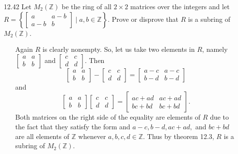 \documentclass[12pt]{article}
\begin{document}
\begin{enumerate}
\item[12.42] Let $M_2(\mathbb{Z})$ be the ring of all $2 \times 2$ matrices over the integers and let \\ 
$R = \left\{ \left[ 
\begin{array}{cc}
a & a - b \\
a - b & b
\end{array} \right] \mid a, b \in \mathbb{Z} \right\}$. Prove or disprove that $R$ is a subring of $M_2(\mathbb{Z})$.
\begin{enumerate}
\item[] Again $R$ is clearly nonempty. So, let us take two elements in $R$, namely 
$\left[ \begin{array}{cc}
a & a \\
b & b
\end{array} \right]$ and $\left[ \begin{array}{cc}
c & c \\
d & d
\end{array} \right]$. Then
\[
\left[ \begin{array}{cc}
a & a \\
b & b
\end{array} \right] - \left[ \begin{array}{cc}
c & c \\
d & d
\end{array} \right] =
\left[ \begin{array}{cc}
a - c & a - c \\
b - d & b - d
\end{array} \right]
\]
and
\[
\left[ \begin{array}{cc}
a & a \\
b & b
\end{array} \right] \left[ \begin{array}{cc}
c & c \\
d & d
\end{array} \right] =
\left[ \begin{array}{cc}
ac + ad & ac + ad \\
bc + bd & bc + bd
\end{array} \right].
\] 
Both matrices on the right side of the equality are elements of $R$ due to the fact that
they satisfy the form and $a - c, b - d, ac + ad,$
and $bc + bd$ are all elements of $\mathbb{Z}$ whenever $a, b, c, d \in \mathbb{Z}$.
Thus by theorem 12.3, $R$ is a subring of $M_2(\mathbb{Z})$.
\end{enumerate}


\end{enumerate}
\end{document}
